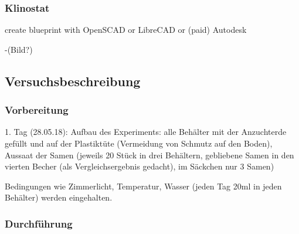 \documentclass[
a4paper, 
11pt, 
ngerman,
listof=totoc,
bibliography=totocnumbered,
abstracton
]{scrreprt}
\begin{document}
\subsubsection{Klinostat}

create blueprint with OpenSCAD or LibreCAD or (paid) Autodesk

-(Bild?)

\subsection{Versuchsbeschreibung}

\subsubsection{Vorbereitung}

1. Tag (28.05.18): Aufbau des Experiments: alle Behälter mit der Anzuchterde gefüllt und auf der Plastiktüte (Vermeidung von Schmutz auf den Boden), Aussaat der Samen (jeweils 20 Stück in drei Behältern, gebliebene Samen in den vierten Becher (als Vergleichsergebnis gedacht), im Säckchen nur 3 Samen)

Bedingungen wie Zimmerlicht, Temperatur, Wasser (jeden Tag 20ml in jeden Behälter) werden eingehalten.



\subsubsection{Durchführung}




\end{document}
